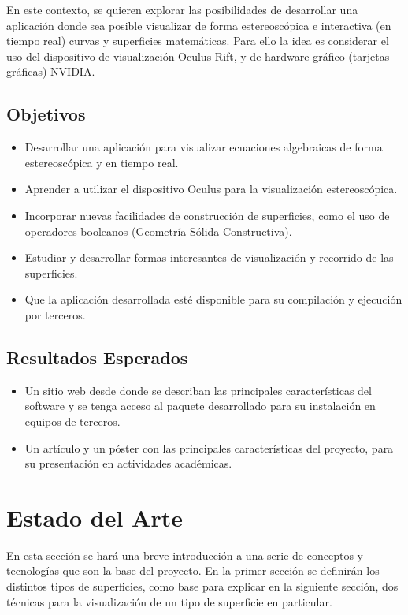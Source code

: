 \documentclass[12pt]{article}
\begin{document}
En este contexto, se quieren explorar las posibilidades de desarrollar una aplicación donde sea posible visualizar de forma estereoscópica e interactiva (en tiempo real) curvas y superficies matemáticas. Para ello la idea es considerar el uso del dispositivo de visualización Oculus Rift, y de hardware gráfico (tarjetas gráficas) NVIDIA.
\subsection{Objetivos}
\begin{itemize}
\item Desarrollar una aplicación para visualizar ecuaciones algebraicas de forma estereoscópica y en tiempo real.
\item Aprender a utilizar el dispositivo Oculus para la visualización estereoscópica. 
\item Incorporar nuevas facilidades de construcción de superficies, como el uso de operadores booleanos (Geometría Sólida Constructiva). 
\item Estudiar y desarrollar formas interesantes de visualización y recorrido de las superficies.
\item Que la aplicación desarrollada esté disponible para su compilación y ejecución por terceros. 
\end{itemize}
\subsection{Resultados Esperados}
\begin{itemize}
\item Un sitio web desde donde se describan las principales características del software y se tenga acceso al paquete desarrollado para su instalación en equipos de terceros. 
\item Un artículo y un póster con las principales características del proyecto, para su presentación en actividades académicas.
\end{itemize}
\clearpage
\section{Estado del Arte}
\noindent En esta sección se hará una breve introducción a una serie de conceptos y tecnologías que son la base del proyecto. En la primer sección se definirán los distintos tipos de superficies, como base para explicar en la siguiente sección, dos técnicas para la visualización de un tipo de superficie en particular. 
\end{document}
